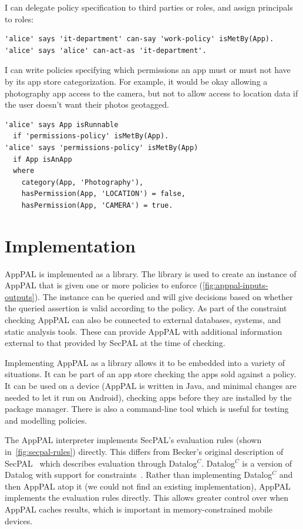 \documentclass[thesis.tex]{subfiles}
\begin{document}
I can delegate policy specification to third parties or roles, and assign principals to roles:

\begin{lstlisting}
'alice' says 'it-department' can-say 'work-policy' isMetBy(App).
'alice' says 'alice' can-act-as 'it-department'.
\end{lstlisting}

I can write policies specifying which permissions an app must or must not have
by its app store categorization. For example, it would be okay allowing a
photography app access to the camera, but not to allow access to location data
if the user doesn't want their photos geotagged.

\begin{lstlisting}
'alice' says App isRunnable
  if 'permissions-policy' isMetBy(App).
'alice' says 'permissions-policy' isMetBy(App)
  if App isAnApp
  where
    category(App, 'Photography'),
    hasPermission(App, 'LOCATION') = false,
    hasPermission(App, 'CAMERA') = true.
\end{lstlisting}

\section{Implementation}
\label{sec:implementation}

AppPAL is implemented as a library.
The library is used to create an instance of AppPAL that is given one or more policies to enforce (\autoref{fig:apppal-inputs-outputs}).
The instance can be queried and will give decisions based on whether the queried assertion is valid according to the policy.
As part of the constraint checking AppPAL can also be connected to external databases, systems, and static analysis tools.
These can provide AppPAL with additional information external to that provided by SecPAL at the time of checking.

Implementing AppPAL as a library allows it to be embedded into a variety of situations.
It can be part of an app store checking the apps sold against a policy.
It can be used on a device (AppPAL is written in Java, and minimal changes are needed to let it run on Android), checking apps before they are installed by the package manager.
There is also a command-line tool which is useful for testing and modelling policies.

The AppPAL interpreter implements SecPAL's evaluation rules (shown in~\autoref{fig:secpal-rules}) directly.
This differs from Becker's original description of SecPAL~\cite{becker_secpal:_2010} which describes evaluation through Datalog$^C$.
Datalog$^C$ is a version of Datalog with support for constraints~\cite{li_datalog_2003}.
Rather than implementing Datalog$^C$ and then AppPAL atop it (we could not find an existing implementation), AppPAL implements the evaluation rules directly.
This allows greater control over when AppPAL caches results, which is important in memory-constrained mobile devices.
\end{document}
